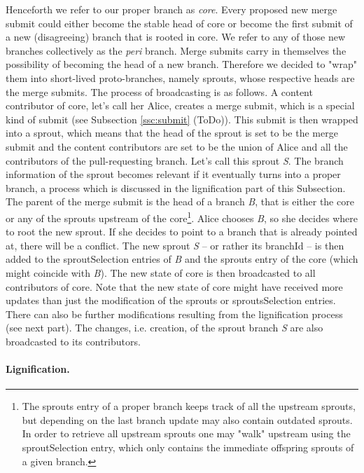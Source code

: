 \documentclass[14pt]{article}
\newcommand{\remark}[1]{{\color{purple} (#1)}}
\begin{document}
Henceforth we refer to our proper branch as \textit{core}. Every proposed new merge submit could either become the stable head of core or become the first submit of a new (disagreeing) branch that is rooted in core. We refer to any of those new branches collectively as the \textit{peri} branch. Merge submits carry in themselves the possibility of becoming the head of a new branch. Therefore we decided to "wrap" them into short-lived proto-branches, namely sprouts, whose respective heads are the merge submits. The process of broadcasting is as follows. A content contributor of core, let's call her Alice, creates a merge submit, which is a special kind of submit (see Subsection \ref{ssc:submit} \remark{ToDo}). This submit is then wrapped into a sprout, which means that the head of the sprout is set to be the merge submit and the content contributors are set to be the union of Alice and all the contributors of the pull-requesting branch. Let's call this sprout \textit{S}. The branch information of the sprout becomes relevant if it eventually turns into a proper branch, a process which is discussed in the lignification part of this Subsection. The parent of the merge submit is the head of a branch \textit{B}, that is either the core or any of the sprouts upstream of the core\footnote{The sprouts entry of a proper branch keeps track of all the upstream sprouts, but depending on the last branch update may also contain outdated sprouts. In order to retrieve all upstream sprouts one may "walk" upstream using the sproutSelection entry, which only contains the immediate offspring sprouts of a given branch.}. Alice chooses \textit{B}, so she decides where to root the new sprout. If she decides to point to a branch that is already pointed at, there will be a conflict. The new sprout \textit{S} -- or rather its branchId -- is then added to the sproutSelection entries of \textit{B} and the sprouts entry of the core (which might coincide with \textit{B}). The new state of core is then broadcasted to all contributors of core. Note that the new state of core might have received more updates than just the modification of the sprouts or sproutsSelection entries. There can also be further modifications resulting from the lignification process (see next part). The changes, i.e. creation, of the sprout branch \textit{S} are also broadcasted to its contributors. 

\paragraph{Lignification.}
\end{document}
